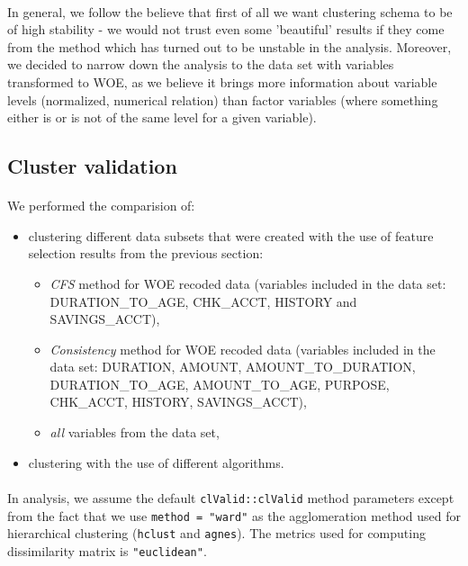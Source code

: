 \documentclass[10pt]{article}\usepackage[]{graphicx}\usepackage[]{color}
\begin{document}
\paragraph{}
In general, we follow the believe that first of all
we want clustering schema to be of high stability - we would  not trust even some 
'beautiful' results if they come from the method which has turned out to be unstable
in the analysis. Moreover, we decided to narrow down the analysis 
to the data set with variables transformed to WOE, as we believe it
brings more information about variable levels (normalized, numerical relation)
than factor variables (where something either is or is not of the same level for a given variable).  


\subsection{Cluster validation}
\paragraph{}
We performed the comparision of: 
\begin{itemize}
\item clustering different data subsets that were created with the use of 
feature selection results from the previous section:
\begin{itemize}
\item \textit{CFS} method for WOE recoded data (variables included in the data set: 
DURATION\_TO\_AGE, CHK\_ACCT, HISTORY and SAVINGS\_ACCT),
\item \textit{Consistency} method for WOE recoded data (variables included in the data set: 
DURATION, AMOUNT, AMOUNT\_TO\_DURATION, DURATION\_TO\_AGE, AMOUNT\_TO\_AGE,
PURPOSE, CHK\_ACCT, HISTORY, SAVINGS\_ACCT),
\item \textit{all} variables from the data set,
\end{itemize}
\item clustering with the use of different algorithms.
\end{itemize}
\paragraph{}
In analysis, we assume the default \texttt{clValid::clValid} method parameters except from
the fact that we use \texttt{method = "ward"} as the 
 agglomeration method used for hierarchical clustering (\texttt{hclust} and \texttt{agnes}). The metrics used for computing dissimilarity matrix is \texttt{"euclidean"}.
\end{document}

